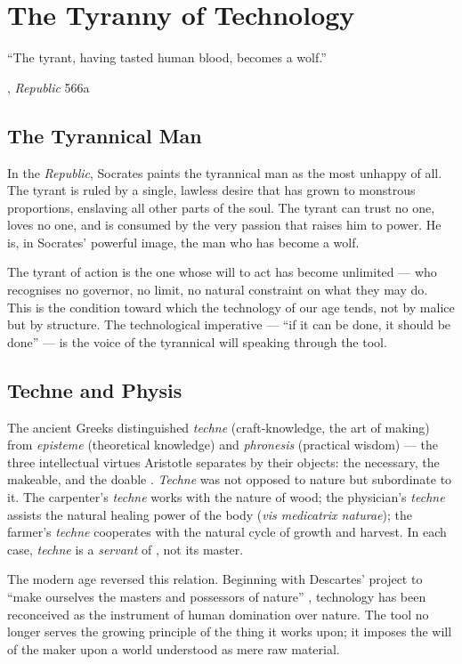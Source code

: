 \chapter{The Tyranny of Technology}

\epigraph{``The tyrant, having tasted human blood, becomes a wolf.''}{\textcite{plato1997complete},
\emph{Republic} 566a}

\section{The Tyrannical Man}

In the \emph{Republic}, Socrates paints the tyrannical man as the most unhappy
of all. The tyrant is ruled by a single, lawless desire that has grown to
monstrous proportions, enslaving all other parts of the soul. The tyrant can
trust no one, loves no one, and is consumed by the very passion that raises
him to power. He is, in Socrates' powerful image, the man who has become a wolf.

The tyrant of action is the one whose will to act has become unlimited --- who
recognises no governor, no limit, no natural constraint on what they may do.
This is the condition toward which the technology of our age tends, not by
malice but by structure. The technological imperative --- ``if it can be done,
it should be done'' --- is the voice of the tyrannical will speaking through
the tool.

\section{Techne and Physis}

The ancient Greeks distinguished \emph{techne} (craft-knowledge, the art of
making) from \emph{episteme} (theoretical knowledge) and \emph{phronesis}
(practical wisdom) --- the three intellectual virtues Aristotle separates by their
objects: the necessary, the makeable, and the doable \parencite[VI.3--5]{aristotle2000ethics}.
\emph{Techne} was not opposed to nature but subordinate to it. The carpenter's \emph{techne} works with the nature of wood; the physician's
\emph{techne} assists the natural healing power of the body (\emph{vis
medicatrix naturae}); the farmer's \emph{techne} cooperates with the natural
cycle of growth and harvest. In each case, \emph{techne} is a \emph{servant} of
\physis, not its master.

The modern age reversed this relation. Beginning with Descartes' project to
``make ourselves the masters and possessors of nature'' \parencite{heidegger1977question}, technology has been
reconceived as the instrument of human domination over nature. The tool no longer
serves the growing principle of the thing it works upon; it imposes the will
of the maker upon a world understood as mere raw material.

